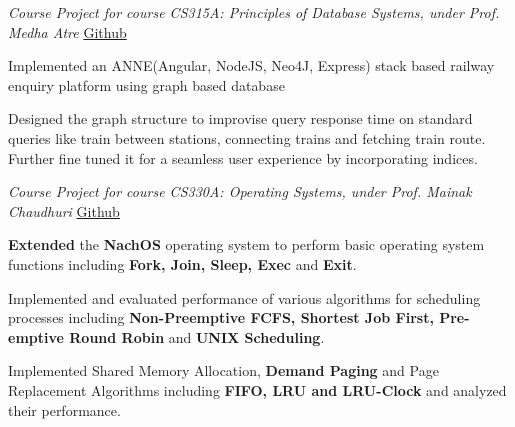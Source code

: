\documentclass[a4paper]{norm-resume}
\begin{document}
    \vspace{5mm}

      
    \emph{Course Project for course CS315A: Principles of Database Systems, under Prof. Medha Atre} \hfill \small \href{https://github.com/tulsyan/RailQuery}{Github}
    \vspace{3mm}
    \begin{tightitemize}
    \small
    {
    \item Implemented an ANNE(Angular, NodeJS, Neo4J, Express) stack based railway enquiry platform using graph based database
    \item Designed the graph structure to improvise query response time on standard queries like train between stations, connecting trains and fetching train route. Further fine tuned it for a seamless user experience by incorporating indices.
    }
    \end{tightitemize}

    \vspace{5mm}

       
    \emph{Course Project for course CS330A: Operating Systems, under Prof. Mainak Chaudhuri} \hfill \small \href{https://github.com/sakshamsharma/cs330assignments}{Github}
    \vspace{3mm}
    \begin{tightitemize}
    \small
    {
    \item \textbf{Extended} the \textbf{NachOS} operating system to perform basic operating system functions including \textbf{Fork, Join, Sleep, Exec} and \textbf{Exit}.
    \item Implemented and evaluated performance of various algorithms for scheduling processes including \textbf{Non-Preemptive FCFS, Shortest Job First, Pre-emptive Round Robin} and \textbf{UNIX Scheduling}.
    \item Implemented Shared Memory Allocation, \textbf{Demand Paging} and Page Replacement Algorithms including \textbf{FIFO, LRU and LRU-Clock} and analyzed their performance.
    }
    \end{tightitemize}

    \vspace{5mm}
\end{document}
